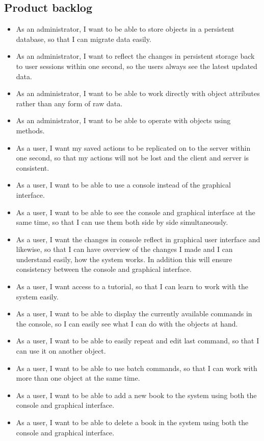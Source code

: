 \subsection{Product backlog}
\begin{itemize}
  \item As an administrator, I want to be able to store objects in a persistent database, so that I can migrate data easily.
  \item As an administrator, I want to reflect the changes in persistent storage back to user sessions within one second, so the users always see the latest updated data.
  \item As an administrator, I want to be able to work directly with object attributes rather than any form of raw data.
  \item As an administrator, I want to be able to operate with objects using methods.
  \item As a user, I want my saved actions to be replicated on to the server within one second, so that my actions will not be lost and the client and server is consistent.
  \item As a user, I want to be able to use a console instead of the graphical interface.
  \item As a user, I want to be able to see the console and graphical interface at the same time, so that I can use them both side by side simultaneously.
  \item As a user, I want the changes in console reflect in graphical user interface and likewise, so that I can have overview of the changes I made and I can understand easily, how the system works. In addition this will ensure consistency between the console and graphical interface.
  \item As a user, I want access to a tutorial, so that I can learn to work with the system easily.
  \item As a user, I want to be able to display the currently available commands in the console, so I can easily see what I can do with the objects at hand.
  \item As a user, I want to be able to easily repeat and edit last command, so that I can use it on another object.
  \item As a user, I want to be able to use batch commands, so that I can work with more than one object at the same time.
  \item As a user, I want to be able to add a new book to the system using both the console and graphical interface.
  \item As a user, I want to be able to delete a book in the system using both the console and graphical interface.

\end{itemize}
